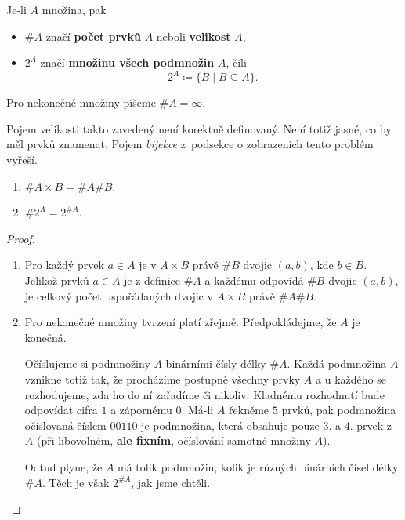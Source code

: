 \begin{definition}
 Je-li $A$ množina, pak
 \begin{itemize}
  \item $\#A$ značí \textbf{počet prvků} $A$ neboli \textbf{velikost} $A$,
  \item $2^{A}$ značí \textbf{množinu všech podmnožin} $A$, čili
   \[
    2^{A} \coloneqq \{B \mid B \subseteq A\}.
   \]
 \end{itemize}
 Pro nekonečné množiny píšeme $\#A = \infty$.
\end{definition}

\begin{warning}
 Pojem velikosti takto zavedený není korektně definovaný. Není totiž jasné, co
 by měl  prvků znamenat. Pojem \emph{bijekce} z~podsekce o zobrazeních
 tento problém vyřeší.
\end{warning}

\begin{claim}
 \hfill
 \vspace*{-.5\parskip}
 \begin{enumerate}
  \item $\#A \times B = \#A\#B$.
  \item $\#2^{A} = 2^{\# A}$.
 \end{enumerate}
\end{claim}
\begin{proof}
 \hfill
 \vspace*{-.5\parskip}
 \begin{enumerate}
  \item Pro každý prvek $a \in A$ je v $A \times B$ právě $\# B$ dvojic $(a,b)$,
   kde $b \in B$. Jelikož prvků $a \in A$ je z definice $\# A$ a každému
   odpovídá $\# B$ dvojic $(a,b)$, je celkový počet uspořádaných dvojic v $A
   \times B$ právě $\# A \# B$.
  \item Pro nekonečné množiny tvrzení platí zřejmě. Předpokládejme, že $A$ je
   konečná.
   
   Očíslujeme si podmnožiny $A$ binárními čísly délky $\# A$. Každá podmnožina
   $A$ vznikne totiž tak, že procházíme postupně všech\-ny prvky $A$ a u každého
   se rozhodujeme, zda ho do ní zařadíme či nikoliv. Kladnému rozhodnutí bude
   odpovídat cifra $1$ a zápornému $0$. Má-li $A$ řekněme $5$ prvků, pak
   podmnožina očíslovaná číslem $00110$ je podmnožina, která obsahuje pouze $3.$
   a $4.$ prvek z $A$ (při libovolném, \textbf{ale fixním}, očíslování samotné
   množiny $A$).

   Odtud plyne, že $A$ má tolik podmnožin, kolik je různých binárních čísel
   délky $\# A$. Těch je však $2^{\# A}$, jak jsme chtěli.\qedhere
 \end{enumerate}
\end{proof}
